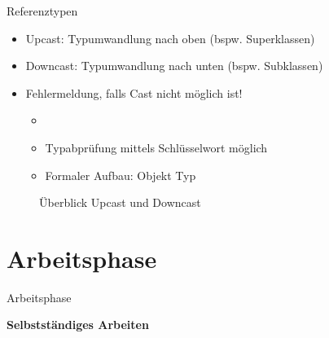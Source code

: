 \documentclass{../tuda-beamer}
\begin{document}
  \begin{frame}{Referenztypen}
    \begin{itemize}
      \item Upcast: Typumwandlung nach oben (bspw. Superklassen)
      \item Downcast: Typumwandlung nach unten (bspw. Subklassen)
      \item Fehlermeldung, falls Cast nicht möglich ist!
      \begin{itemize}
        \item {}
        \item Typabprüfung mittels Schlüsselwort  möglich
        \item Formaler Aufbau: Objekt  Typ
      \end{itemize}
    \end{itemize}
    \begin{figure}[h]
      \centering
      \caption{Überblick Upcast und Downcast}
    \end{figure}
  \end{frame}


  \section{Arbeitsphase}
  \begin{frame}[c]{Arbeitsphase}
    \begin{center}
      \textbf{\LARGE Selbstständiges Arbeiten}
    \end{center}
  \end{frame}
\end{document}
